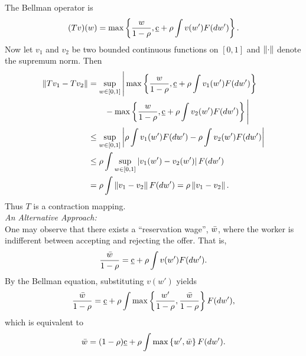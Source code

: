 \documentclass[12pt]{article}
\begin{document}
\begin{sol}[4.2]
    The Bellman operator is 
    \begin{equation*}
        (Tv)(w) = \max \left\{ {\frac{w}{1-\rho}, \underbar{c} + \rho \int v(w') F(dw')} \right\}.
    \end{equation*}
    Now let $v_1$ and $v_2$ be two bounded continuous functions on $[0,1]$ and 
    $\left\lVert {\cdot} \right\rVert$ denote the supremum norm. Then
    \begin{equation*}
        \begin{aligned}
            \left\lVert {Tv_1 - Tv_2} \right\rVert &= \sup_{w\in[0,1]}\Bigg\lvert\max\left\{ {\frac{w}{1-\rho}, \underbar{c} + \rho \int v_1(w') F(dw')} \right\}\\ 
            &\qquad- \max\left\{ {\frac{w}{1-\rho}, \underbar{c} + \rho \int v_2(w') F(dw')} \right\}\Bigg\rvert \\
            &\leq \sup_{w\in[0,1]}\left\lvert {\rho \int v_1(w') F(dw') - \rho \int v_2(w') F(dw')} \right\rvert\\ 
            &\leq \rho \int \sup_{w\in[0,1]}\left\lvert {v_1(w') - v_2(w')} \right\rvert F(dw')\\
            &= \rho \int \left\lVert {v_1 - v_2} \right\rVert F(dw') = \rho \left\lVert {v_1 - v_2} \right\rVert.
        \end{aligned}
    \end{equation*}
    Thus $T$ is a contraction mapping. \solend \\
    \textit{An Alternative Approach:} \\
    One may observe that there exists a ``reservation wage'', $\Bar{w}$, 
    where the worker is indifferent between accepting and rejecting the 
    offer. That is,
    \begin{equation*}
        \frac{\Bar{w}}{1-\rho} = \underbar{c} + \rho \int v(w') F(dw').
    \end{equation*} 
    By the Bellman equation, substituting $v(w')$ yields
    \begin{equation*}
        \frac{\Bar{w}}{1-\rho} = \underbar{c} + \rho \int \max\left\{ {\frac{w'}{1-\rho}, \frac{\Bar{w}}{1-\rho}} \right\} F(dw'), 
    \end{equation*}
    which is equivalent to 
    \begin{equation*}
        \Bar{w} = (1-\rho)\underbar{c} + \rho \int \max\left\{ {w', \Bar{w}} \right\} F(dw').
    \end{equation*}
\end{sol}
\end{document}
